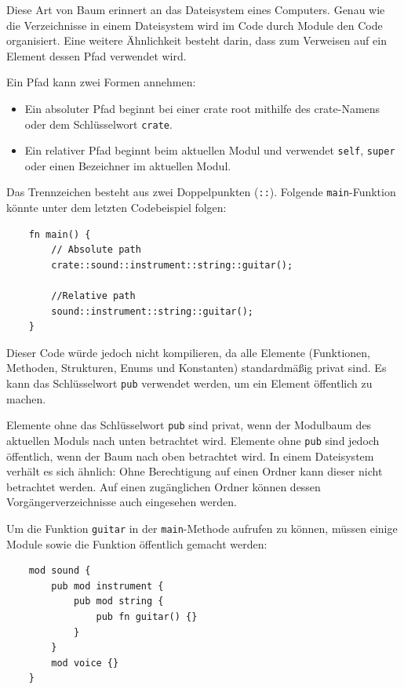 Diese Art von Baum erinnert an das Dateisystem eines Computers. Genau wie die Verzeichnisse in einem Dateisystem wird im Code durch Module den Code organisiert. Eine weitere Ähnlichkeit besteht darin, dass zum Verweisen auf ein Element dessen Pfad verwendet wird.

Ein Pfad kann zwei Formen annehmen:

\begin{itemize}
    \item Ein absoluter Pfad beginnt bei einer crate root mithilfe des crate-Namens oder dem Schlüsselwort \verb"crate".
    \item Ein relativer Pfad beginnt beim aktuellen Modul und verwendet \verb"self", \verb"super" oder einen Bezeichner im aktuellen Modul.
\end{itemize}

Das Trennzeichen besteht aus zwei Doppelpunkten (\verb"::"). Folgende \verb"main"-Funktion könnte unter dem letzten Codebeispiel folgen:

\begin{lstlisting}
    fn main() {
        // Absolute path
        crate::sound::instrument::string::guitar();

        //Relative path
        sound::instrument::string::guitar();
    }
\end{lstlisting}

Dieser Code würde jedoch nicht kompilieren, da alle Elemente (Funktionen, Methoden, Strukturen, Enums und Konstanten) standardmäßig privat sind. Es kann das Schlüsselwort \verb"pub" verwendet werden, um ein Element öffentlich zu machen.

Elemente ohne das Schlüsselwort \verb"pub" sind privat, wenn der Modulbaum des aktuellen Moduls \glqq nach unten\grqq{} betrachtet wird. Elemente ohne \verb"pub" sind jedoch öffentlich, wenn der Baum \glqq nach oben\grqq{} betrachtet wird. In einem Dateisystem verhält es sich ähnlich: Ohne Berechtigung auf einen Ordner kann dieser nicht betrachtet werden. Auf einen zugänglichen Ordner können dessen Vor\-gän\-ger\-ver\-zeich\-nis\-se auch eingesehen werden.

Um die Funktion \verb"guitar" in der \verb"main"-Methode aufrufen zu können, müssen ei\-ni\-ge Module sowie die Funktion öffentlich gemacht werden:

\begin{lstlisting}
    mod sound {
        pub mod instrument {
            pub mod string {
                pub fn guitar() {}
            }
        }
        mod voice {}
    }
\end{lstlisting}

